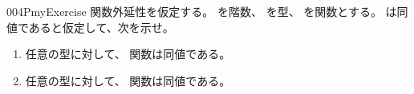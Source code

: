 \documentclass[index]{subfiles}
\begin{document}
\begin{myBlock}{004P}{myExercise}
  関数外延性を仮定する。
  を階数、
  を型、
  を関数とする。
  は同値であると仮定して、次を示せ。
  \begin{enumerate}
  \item \label{004P:0000} 任意の型に対して、
    関数は同値である。
  \item \label{004P:0001} 任意の型に対して、
    関数は同値である。
  \end{enumerate}
\end{myBlock}
\end{document}
